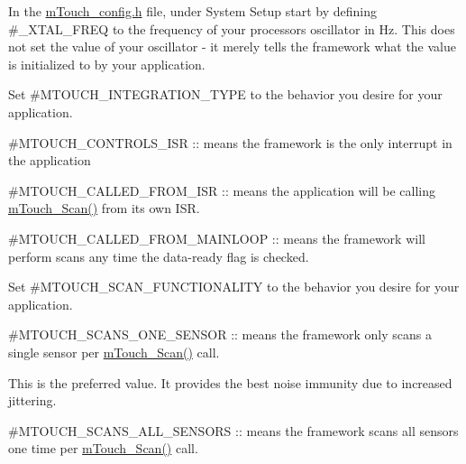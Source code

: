 \begin{DoxyEnumerate}
\item In the \hyperlink{m_touch__config_8h}{m\+Touch\+\_\+config.\+h} file, under \textquotesingle{}System Setup\textquotesingle{} start by defining \#\+\_\+\+X\+T\+A\+L\+\_\+\+F\+R\+E\+Q to the frequency of your processor\textquotesingle{}s oscillator in Hz. This does not set the value of your oscillator -\/ it merely tells the framework what the value is initialized to by your application. 
\item Set \#\+M\+T\+O\+U\+C\+H\+\_\+\+I\+N\+T\+E\+G\+R\+A\+T\+I\+O\+N\+\_\+\+T\+Y\+P\+E to the behavior you desire for your application. 
\begin{DoxyItemize}
\item \#\+M\+T\+O\+U\+C\+H\+\_\+\+C\+O\+N\+T\+R\+O\+L\+S\+\_\+\+I\+S\+R \+:\+: means the framework is the only interrupt in the application 
\item \#\+M\+T\+O\+U\+C\+H\+\_\+\+C\+A\+L\+L\+E\+D\+\_\+\+F\+R\+O\+M\+\_\+\+I\+S\+R \+:\+: means the application will be calling \hyperlink{group___acquisition_gaeeee5d5e14eaff7df78e9ad5d7ac9769}{m\+Touch\+\_\+\+Scan()} from its own I\+S\+R. 
\item \#\+M\+T\+O\+U\+C\+H\+\_\+\+C\+A\+L\+L\+E\+D\+\_\+\+F\+R\+O\+M\+\_\+\+M\+A\+I\+N\+L\+O\+O\+P \+:\+: means the framework will perform scans any time the data-\/ready flag is checked. 
\end{DoxyItemize}
\item Set \#\+M\+T\+O\+U\+C\+H\+\_\+\+S\+C\+A\+N\+\_\+\+F\+U\+N\+C\+T\+I\+O\+N\+A\+L\+I\+T\+Y to the behavior you desire for your application. 
\begin{DoxyItemize}
\item \#\+M\+T\+O\+U\+C\+H\+\_\+\+S\+C\+A\+N\+S\+\_\+\+O\+N\+E\+\_\+\+S\+E\+N\+S\+O\+R \+:\+: means the framework only scans a single sensor per \hyperlink{group___acquisition_gaeeee5d5e14eaff7df78e9ad5d7ac9769}{m\+Touch\+\_\+\+Scan()} call. 
\begin{DoxyItemize}
\item This is the preferred value. It provides the best noise immunity due to increased jittering. 
\end{DoxyItemize}
\item \#\+M\+T\+O\+U\+C\+H\+\_\+\+S\+C\+A\+N\+S\+\_\+\+A\+L\+L\+\_\+\+S\+E\+N\+S\+O\+R\+S \+:\+: means the framework scans all sensors one time per \hyperlink{group___acquisition_gaeeee5d5e14eaff7df78e9ad5d7ac9769}{m\+Touch\+\_\+\+Scan()} call. 
\begin{DoxyItemize}

\end{DoxyItemize}
\end{DoxyItemize}
\end{DoxyEnumerate}
